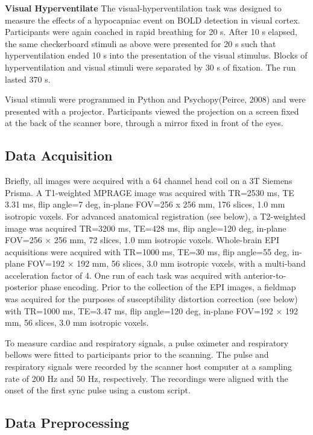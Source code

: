\documentclass[9pt]{NEU502b-fmri}
\begin{document}
\textbf{Visual Hyperventilate} The visual-hyperventilation task was designed to measure the effects of a hypocapniac event on BOLD detection in visual cortex. Participants were again coached in rapid breathing for 20 s. After 10 s elapsed, the same checkerboard stimuli as above were presented for 20 s such that hyperventilation ended 10 s into the presentation of the visual stimulus. Blocks of hyperventilation and visual stimuli were separated by 30 s of fixation. The run lasted 370 s.

Visual stimuli were programmed in Python and Psychopy(Peirce, 2008) and were presented with a projector. Participants viewed the projection on a screen fixed at the back of the scanner bore, through a mirror fixed in front of the eyes.

\subsection{Data Acquisition}
Briefly, all images were acquired with a 64 channel head coil on a 3T Siemens Prisma. A T1-weighted MPRAGE image was acquired with TR=2530 ms,  TE 3.31 ms, flip angle=7 deg, in-plane FOV=256 x 256 mm, 176 slices, 1.0 mm isotropic voxels. For advanced anatomical registration (see below), a T2-weighted image was acquired TR=3200 ms, TE=428 ms, flip angle=120 deg, in-plane FOV=256 × 256 mm, 72 slices, 1.0 mm isotropic voxels. Whole-brain EPI acquisitions were acquired with TR=1000 ms, TE=30 ms, flip angle=55 deg, in-plane FOV=192 × 192 mm, 56 slices, 3.0 mm isotropic voxels, with a multi-band acceleration factor of 4. One run of each task was acquired with anterior-to-posterior phase encoding. Prior to the collection of the EPI images, a fieldmap was acquired for the purposes of susceptibility distortion correction (see below) with TR=1000 ms, TE=3.47 ms, flip angle=120 deg, in-plane FOV=192 × 192 mm, 56 slices, 3.0 mm isotropic voxels.

To measure cardiac and respiratory signals, a pulse oximeter and respiratory bellows were fitted to participants prior to the scanning. The pulse and respiratory signals were recorded by the scanner host computer at a sampling rate of 200 Hz and 50 Hz, respectively. The recordings were aligned with the onset of the first sync pulse using a custom script. 

\subsection{Data Preprocessing}
\end{document}
